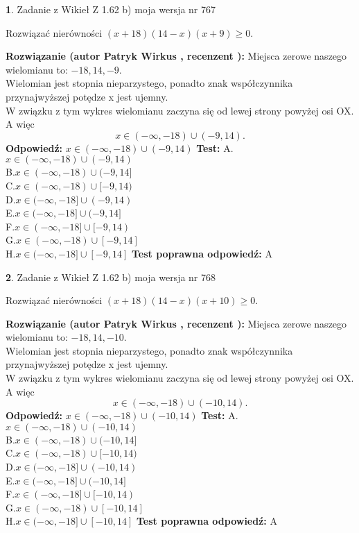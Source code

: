\documentclass[12pt, a4paper]{article}
\theoremstyle{definition} %
\newtheorem{zad}{}
\newcommand{\zadStart}[1]{\begin{zad}#1\newline}
\newcommand{\zadStop}{\end{zad}}
\newcommand{\rozwStart}[2]{\noindent \textbf{Rozwiązanie (autor #1 , recenzent #2): }\newline}
\newcommand{\rozwStop}{\newline}
\newcommand{\odpStart}{\noindent \textbf{Odpowiedź:}\newline}
\newcommand{\odpStop}{\newline}
\newcommand{\testStart}{\noindent \textbf{Test:}\newline}
\newcommand{\testStop}{\newline}
\newcommand{\kluczStart}{\noindent \textbf{Test poprawna odpowiedź:}\newline}
\newcommand{\kluczStop}{\newline}
\begin{document}
\zadStart{Zadanie z Wikieł Z 1.62 b) moja wersja nr 767}

Rozwiązać nierówności $(x+18)(14-x)(x+9)\ge0$.
\zadStop
\rozwStart{Patryk Wirkus}{}
Miejsca zerowe naszego wielomianu to: $-18, 14, -9$.\\
Wielomian jest stopnia nieparzystego, ponadto znak współczynnika przy\linebreak najwyższej potędze x jest ujemny.\\ W związku z tym wykres wielomianu zaczyna się od lewej strony powyżej osi OX. A więc $$x \in (-\infty,-18) \cup (-9,14).$$
\rozwStop
\odpStart
$x \in (-\infty,-18) \cup (-9,14)$
\odpStop
\testStart
A.$x \in (-\infty,-18) \cup (-9,14)$\\
B.$x \in (-\infty,-18) \cup (-9,14]$\\
C.$x \in (-\infty,-18) \cup [-9,14)$\\
D.$x \in (-\infty,-18] \cup (-9,14)$\\
E.$x \in (-\infty,-18] \cup (-9,14]$\\
F.$x \in (-\infty,-18] \cup [-9,14)$\\
G.$x \in (-\infty,-18) \cup [-9,14]$\\
H.$x \in (-\infty,-18] \cup [-9,14]$
\testStop
\kluczStart
A
\kluczStop



\zadStart{Zadanie z Wikieł Z 1.62 b) moja wersja nr 768}

Rozwiązać nierówności $(x+18)(14-x)(x+10)\ge0$.
\zadStop
\rozwStart{Patryk Wirkus}{}
Miejsca zerowe naszego wielomianu to: $-18, 14, -10$.\\
Wielomian jest stopnia nieparzystego, ponadto znak współczynnika przy\linebreak najwyższej potędze x jest ujemny.\\ W związku z tym wykres wielomianu zaczyna się od lewej strony powyżej osi OX. A więc $$x \in (-\infty,-18) \cup (-10,14).$$
\rozwStop
\odpStart
$x \in (-\infty,-18) \cup (-10,14)$
\odpStop
\testStart
A.$x \in (-\infty,-18) \cup (-10,14)$\\
B.$x \in (-\infty,-18) \cup (-10,14]$\\
C.$x \in (-\infty,-18) \cup [-10,14)$\\
D.$x \in (-\infty,-18] \cup (-10,14)$\\
E.$x \in (-\infty,-18] \cup (-10,14]$\\
F.$x \in (-\infty,-18] \cup [-10,14)$\\
G.$x \in (-\infty,-18) \cup [-10,14]$\\
H.$x \in (-\infty,-18] \cup [-10,14]$
\testStop
\kluczStart
A
\kluczStop
\end{document}
